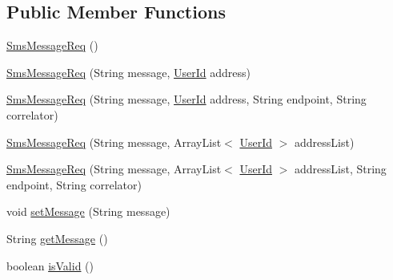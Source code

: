 \subsection*{Public Member Functions}
\begin{DoxyCompactItemize}
\item 
\hyperlink{classcom_1_1bluevia_1_1messagery_1_1mt_1_1sms_1_1data_1_1SmsMessageReq_a7fb0e10655b89cce98a1a0f8067e6200}{SmsMessageReq} ()
\item 
\hyperlink{classcom_1_1bluevia_1_1messagery_1_1mt_1_1sms_1_1data_1_1SmsMessageReq_a8a678fd6a564ad664febec861b0a86de}{SmsMessageReq} (String message, \hyperlink{classcom_1_1bluevia_1_1commons_1_1data_1_1UserId}{UserId} address)
\item 
\hyperlink{classcom_1_1bluevia_1_1messagery_1_1mt_1_1sms_1_1data_1_1SmsMessageReq_a54d3fdb809e96586048ba60924df935e}{SmsMessageReq} (String message, \hyperlink{classcom_1_1bluevia_1_1commons_1_1data_1_1UserId}{UserId} address, String endpoint, String correlator)
\item 
\hyperlink{classcom_1_1bluevia_1_1messagery_1_1mt_1_1sms_1_1data_1_1SmsMessageReq_a12a99c660a34aecbf0c80250933d4df5}{SmsMessageReq} (String message, ArrayList$<$ \hyperlink{classcom_1_1bluevia_1_1commons_1_1data_1_1UserId}{UserId} $>$ addressList)
\item 
\hyperlink{classcom_1_1bluevia_1_1messagery_1_1mt_1_1sms_1_1data_1_1SmsMessageReq_ab35a995e93db2b3305653ca8e2d402ee}{SmsMessageReq} (String message, ArrayList$<$ \hyperlink{classcom_1_1bluevia_1_1commons_1_1data_1_1UserId}{UserId} $>$ addressList, String endpoint, String correlator)
\item 
void \hyperlink{classcom_1_1bluevia_1_1messagery_1_1mt_1_1sms_1_1data_1_1SmsMessageReq_a0458eb5df9bf0f4e2d8f84ee42dbdebd}{setMessage} (String message)
\item 
String \hyperlink{classcom_1_1bluevia_1_1messagery_1_1mt_1_1sms_1_1data_1_1SmsMessageReq_a1b2ec8b83dfa6ec2ca5cdd5f97bbcae9}{getMessage} ()
\item 
boolean \hyperlink{classcom_1_1bluevia_1_1messagery_1_1mt_1_1sms_1_1data_1_1SmsMessageReq_a446f7c2f9be9fcdcb72fa896a40983cb}{isValid} ()
\end{DoxyCompactItemize}

